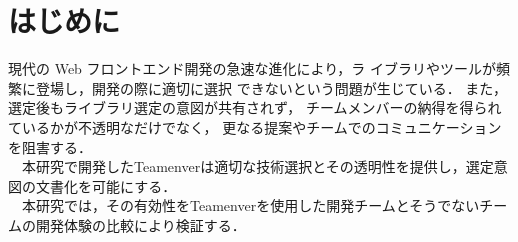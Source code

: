 \documentclass[main]{subfiles}
\begin{document}
\section{はじめに }
現代の Web フロントエンド開発の急速な進化により，ラ
イブラリやツールが頻繁に登場し，開発の際に適切に選択
できないという問題が生じている\cite{npm}\cite{medium.com}．
また，選定後もライブラリ選定の意図が共有されず，
チームメンバーの納得を得られているかが不透明なだけでなく，
更なる提案やチームでのコミュニケーションを阻害する．\\
　本研究で開発したTeamenverは適切な技術選択とその透明性を提供し，選定意図の文書化を可能にする．\\
　本研究では，その有効性をTeamenverを使用した開発チームとそうでないチームの開発体験の比較により検証する．
\end{document}
